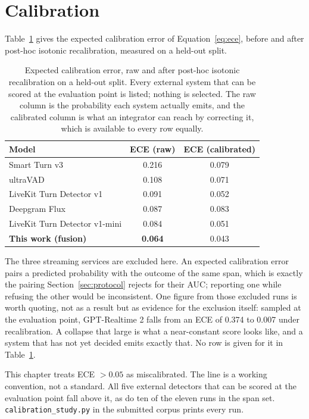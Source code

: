 \section{Calibration}
\label{sec:calibresults}

Table~\ref{tab:ece} gives the expected calibration error of Equation~\ref{eq:ece}, before
and after post-hoc isotonic recalibration, measured on a held-out split.

\begin{table}[H]
\centering
\caption[Expected calibration error]{Expected calibration error, raw and after post-hoc
isotonic recalibration on a held-out split. Every external system that can be scored at the
evaluation point is listed; nothing is selected. The raw column is the probability each
system actually emits, and the calibrated column is what an integrator can reach by
correcting it, which is available to every row equally.}
\label{tab:ece}
\begin{tabular}{@{}lcc@{}}
\toprule
Model & ECE (raw) & ECE (calibrated) \\
\midrule
Smart Turn v3 & 0.216 & 0.079 \\
ultraVAD & 0.108 & 0.071 \\
LiveKit Turn Detector v1 & 0.091 & 0.052 \\
Deepgram Flux & 0.087 & 0.083 \\
LiveKit Turn Detector v1-mini & 0.084 & 0.051 \\
\midrule
\textbf{This work (fusion)} & \textbf{0.064} & 0.043 \\
\bottomrule
\end{tabular}
\end{table}

The three streaming services are excluded here. An expected calibration error pairs a
predicted probability with the outcome of the same span, which is exactly the pairing
Section~\ref{sec:protocol} rejects for their AUC; reporting one while refusing the other
would be inconsistent. One figure from those excluded runs is worth quoting, not as a result but as evidence for
the exclusion itself: sampled at the evaluation point, GPT-Realtime 2 falls from an ECE of
0.374 to 0.007 under recalibration. A collapse that large is what a near-constant score
looks like, and a system that has not yet decided emits exactly that. No row is given for it
in Table~\ref{tab:ece}.

This chapter treats ECE $> 0.05$ as miscalibrated. The line is a working convention, not a
standard. All five external detectors that can be scored at the evaluation point fall above
it, as do ten of the eleven runs in the span set.
\texttt{calibration\_study.py} in the submitted corpus prints every run.

